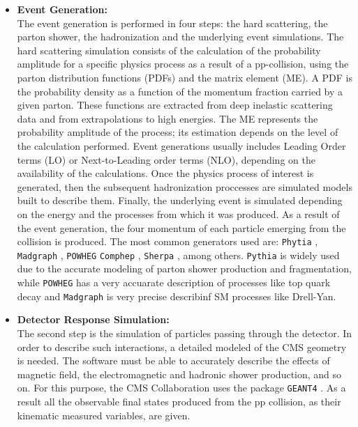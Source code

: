 \begin{itemize}
 \item \textbf{Event Generation:} \\
 The event generation is performed in four steps: the hard scattering, 
 the parton shower, the hadronization and the underlying event simulations.
 The hard scattering simulation consists of the calculation of the 
 probability amplitude for a specific physics process as a result of a pp-collision, using the 
 parton distribution functions (PDFs) and the matrix element (ME). A PDF is
 the probability density as a function of the momentum fraction carried 
 by a given parton. These functions are extracted from deep
 inelastic scattering data and from extrapolations to high energies. The ME 
 represents the probability amplitude of the process; its estimation
 depends on the level of the calculation performed. Event generations 
 usually includes Leading Order terms (LO) or 
 Next-to-Leading order terms (NLO), depending on the 
 availability of the calculations. Once the physics process of interest 
 is generated, then the subsequent hadronization proccesses are simulated
 models built to describe them. Finally, the underlying event is simulated
 depending on the energy and the processes from which it was produced. As a 
 result of the event generation, the four momentum of each particle
 emerging from the collision is produced. The most common generators used 
 are: \texttt{Phytia} \cite{bib:pythia}, \texttt{Madgraph} \cite{bib:madgraph}, 
 \texttt{POWHEG} \cite{bib:Powheg1,bib:Powheg2} 
 \texttt{Comphep} \cite{bib:comphep}, \texttt{Sherpa} \cite{bib:sherpa}, among 
 others. \texttt{Pythia} is widely used due to the accurate modeling of parton shower production
and fragmentation, while \texttt{POWHEG} has a very accuarate description of processes
like top quark decay and \texttt{Madgraph} is very precise describinf SM processes like Drell-Yan. \\


 
  \item \textbf{Detector Response Simulation:}\\
  The second step is the simulation of particles passing through the 
  detector. In order to describe such interactions, a detailed 
  modeled of the CMS geometry is needed. The 
  software must be able to accurately describe the effects of magnetic 
  field, the electromagnetic and hadronic shower production, and so on. For 
  this purpose, the CMS Collaboration uses the package 
  \texttt{GEANT4} \cite{bib:geant4,bib:FullSim}. As a result
  all the observable final states produced from the pp collision, as their 
  kinematic measured variables, are given.\\
\end{itemize}

